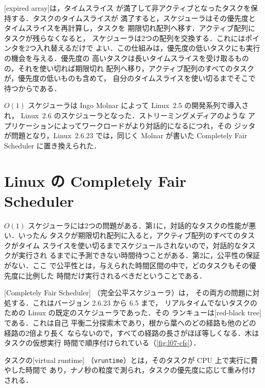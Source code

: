 \documentclass[../main.tex]{subfiles}
\begin{document}
[expired array]は，タイムスライス
が満了して非アクティブとなったタスクを保持する．タスクのタイムスライスが
満了すると，スケジューラはその優先度とタイムスライスを再計算し，タスクを
期限切れ配列へ移す．アクティブ配列にタスクが残らなくなると，
スケジューラは2つの配列を交換する．これにはポインタを2つ入れ替えるだけで
よい．この仕組みは，優先度の低いタスクにも実行の機会を与える．優先度の
高いタスクは長いタイムスライスを受け取るものの，それを使い切れば期限切れ
配列へ移り，アクティブ配列のすべてのタスクが，優先度の低いものも含めて，
自分のタイムスライスを使い切るまでそこで待つからである．

$O(1)$ スケジューラは Ingo Molnar によって Linux~2.5 の開発系列で導入され，
Linux~2.6 のスケジューラとなった．ストリーミングメディアのような
アプリケーションによってワークロードがより対話的になるにつれ，その
ジッタが問題となり，Linux~2.6.23 では，同じく Molnar が書いた Completely
Fair Scheduler に置き換えられた．

\section{Linux の Completely Fair Scheduler}
\label{sec:l07-cfs}

$O(1)$ スケジューラには2つの問題がある．第1に，対話的なタスクの性能が悪い．いったん
タスクが期限切れ配列に入ると，アクティブ配列のすべてのタスクがタイム
スライスを使い切るまでスケジュールされないので，対話的なタスクが実行され
るまでに予測できない時間待つことがある．第2に，公平性の保証がない．ここ
で公平性とは，与えられた時間区間の中で，どのタスクもその優先度に比例した
時間だけ実行されるべきだということである．

[Completely Fair Scheduler]%
（完全公平スケジューラ）は，
その両方の問題に対処する．これはバージョン 2.6.23 から 6.5 まで，
リアルタイムでないタスクのための Linux の既定のスケジューラであった．その
ランキューは[red-black tree]である．これは自己
平衡二分探索木であり，根から葉へのどの経路も他のどの経路の2倍より長く
ならないので，すべての経路の長さがほぼ等しくなる．木はタスクの仮想実行
時間で順序付けられている（\cref{fig:l07-cfs}）．

\begin{definition}[仮想実行時間]
  タスクの[virtual runtime]%
  （\texttt{vruntime}）とは，そのタスクが CPU 上で実行に費やした時間で
  あり，ナノ秒の粒度で測られ，タスクの優先度に応じて重み付けされる．
\end{definition}
\end{document}
